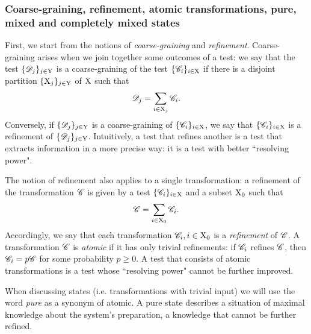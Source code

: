 \documentclass[12pt,aps,pra,showpacs,groupedaddress]{revtex4-1}
\begin{document}
\subsubsection{Coarse-graining, refinement, atomic transformations, pure, mixed and completely mixed states}
First, we start from the notions of \emph{coarse-graining} and \emph{refinement}.  Coarse-graining
arises when we join together some outcomes of a test: we say that the test $\{\mathscr D_j\}_{j \in {\rm Y}}$
is a coarse-graining of the test $\{\mathscr C_i\}_{i \in {\rm X}}$ if there is a disjoint partition
$\{{\rm X}_j\}_{j\in {\rm Y}} $ of ${\rm X}$ such that
\begin{equation*}
  \tD_j  = \sum_{i \in \rX_j} \tC_i.
\end{equation*}
Conversely, if $\{\mathscr D_j\}_{j \in {\rm Y}}$ is a coarse-graining of $\{\mathscr C_i\}_{i \in {\rm X}}$, we say that
$\{\mathscr C_i\}_{i \in {\rm X}}$ is a refinement of $\{\mathscr D_j\}_{j \in {\rm Y}}$.  Intuitively, a test that
refines another is a test that extracts information in a more precise way:  it is a test with  better ``resolving power".


The notion of refinement also applies to a single transformation: a refinement of the transformation
$\mathscr C$ is given by a test $\{\mathscr C_i\}_{i \in {\rm X}}$ and a subset ${\rm X}_0$ such that 
\begin{equation*}
\tC = \sum_{i \in
  \rX_0} \tC_i.
  \end{equation*}  
Accordingly, we say that each transformation $\mathscr C_i, i \in {\rm X}_0$ is a \emph{refinement} of $\mathscr C$.
A transformation $\mathscr C$ is \emph{atomic} if it has only trivial refinements: if $\mathscr C_i$ refines
$\mathscr C$, then $\mathscr C_i =p \mathscr C$ for some probability $p \ge 0 $.
A test that consists of atomic transformations is a test whose ``resolving power" cannot be further improved.



When discussing states (i.e. transformations with trivial input) we will use the word \emph{pure} as a
synonym of atomic.  A pure state describes a situation of maximal knowledge about the system's preparation, a knowledge that cannot be further refined.
\end{document}

